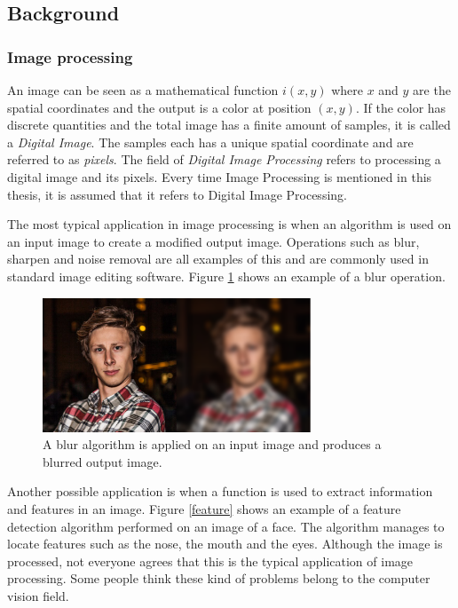 \subsection{Background}
\subsubsection{Image processing}
An image can be seen as a mathematical function $i(x,y)$ where $x$ and $y$ are the spatial coordinates and the output is a color at position $(x,y)$. If the color has discrete quantities and the total image has a finite amount of samples, it is called a \emph{Digital Image}\cite{ipbook}. The samples each has a unique spatial coordinate and are referred to as \emph{pixels}. The field of \emph{Digital Image Processing} refers to processing a digital image and its pixels. Every time Image Processing is mentioned in this thesis, it is assumed that it refers to Digital Image Processing. 
\newline

The most typical application in image processing is when an algorithm is used on an input image to create a modified output image. Operations such as blur, sharpen and noise removal are all examples of this and are commonly used in standard image editing software. Figure \ref{lena} shows an example of a blur operation.
\begin{figure}[ht!]
\centering
\includegraphics[width=80mm]{img/klas.png}
\caption{A blur algorithm is applied on an input image and produces a blurred output image.}
\label{lena}
\end{figure}

Another possible application is when a function is used to extract information and features in an image. Figure \ref{feature} shows an example of a feature detection algorithm performed on an image of a face. The algorithm manages to locate features such as the nose, the mouth and the eyes. Although the image is processed, not everyone agrees that this is the typical application of image processing. Some people think these kind of problems belong to the computer vision field. 

